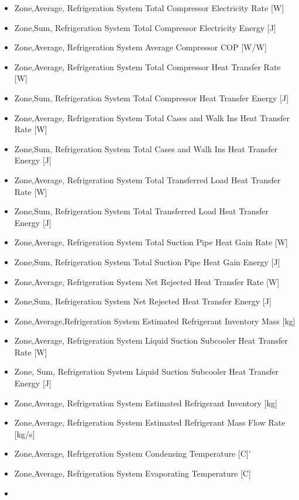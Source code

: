 \begin{itemize}
\item
  Zone,Average, Refrigeration System Total Compressor Electricity Rate {[}W{]}
\item
  Zone,Sum, Refrigeration System Total Compressor Electricity Energy {[}J{]}
\item
  Zone,Average, Refrigeration System Average Compressor COP {[}W/W{]}
\item
  Zone,Average, Refrigeration System Total Compressor Heat Transfer Rate {[}W{]}
\item
  Zone,Sum, Refrigeration System Total Compressor Heat Transfer Energy {[}J{]}
\item
  Zone,Average, Refrigeration System Total Cases and Walk Ins Heat Transfer Rate {[}W{]}
\item
  Zone,Sum, Refrigeration System Total Cases and Walk Ins Heat Transfer Energy {[}J{]}
\item
  Zone,Average, Refrigeration System Total Transferred Load Heat Transfer Rate {[}W{]}
\item
  Zone,Sum, Refrigeration System Total Transferred Load Heat Transfer Energy {[}J{]}
\item
  Zone,Average, Refrigeration System Total Suction Pipe Heat Gain Rate {[}W{]}
\item
  Zone,Sum, Refrigeration System Total Suction Pipe Heat Gain Energy {[}J{]}
\item
  Zone,Average, Refrigeration System Net Rejected Heat Transfer Rate {[}W{]}
\item
  Zone,Sum, Refrigeration System Net Rejected Heat Transfer Energy {[}J{]}
\item
  Zone,Average,Refrigeration System Estimated Refrigerant Inventory Mass {[}kg{]}
\item
  Zone,Average, Refrigeration System Liquid Suction Subcooler Heat Transfer Rate {[}W{]}
\item
  Zone, Sum, Refrigeration System Liquid Suction Subcooler Heat Transfer Energy {[}J{]}
\item
  Zone,Average, Refrigeration System Estimated Refrigerant Inventory {[}kg{]}
\item
  Zone,Average, Refrigeration System Estimated Refrigerant Mass Flow Rate {[}kg/s{]}
\item
  Zone,Average, Refrigeration System Condensing Temperature {[}C{]}'
\item
  Zone,Average, Refrigeration System Evaporating Temperature {[}C{]}
\item

\end{itemize}
